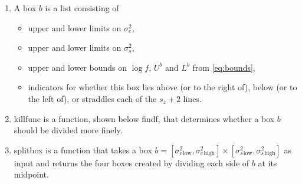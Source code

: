 \documentclass{report}
\newcommand{\textcompute}{\textsf}
\newcommand{\RL}{f}
\newcommand{\logRL}{\log\RL}
\newcommand{\sigssq}{\sigma_s^2}
\newcommand{\sigesq}{\sigma_e^2}
\begin{document}
\begin{enumerate}
\item A \textcompute{box} $b$ is a list consisting of
	 \begin{itemize}
	 \item upper and lower limits on $\sigesq$,
	 \item upper and lower limits on $\sigssq$,
	 \item upper and lower bounds on $\logRL$, $U^b$ and $L^b$ from \eqref{eq:bounds},
	 \item indicators for whether this box lies above (or to the right of), below (or to the left of),
	   or straddles each of the $s_z+2$ lines.
	 \end{itemize}
\item \textcompute{killfunc} is a function, shown below \textcompute{findf}, that determines whether
	a box $b$ should be divided more finely.
\item \textcompute{splitbox} is a function that takes a box $b =
	[\sigesq{}_\text{low}, \sigesq{}_\text{high}] \times [\sigssq{}_\text{low}, \sigssq{}_\text{high}]$ as input 
	and returns the four boxes created by dividing each side of $b$ at its midpoint.
\end{enumerate}
\end{document}
